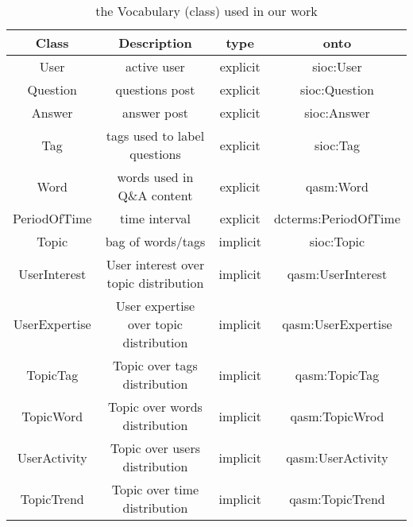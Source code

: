 \begin{sidewaystable}
    \centering
    \begin{tabular}{c|c|c|c}
    \hline
    Class &  Description & type & onto \\ \hline
    User  & active user & explicit &  sioc:User \\ \hline
    Question & questions post & explicit & sioc:Question \\ \hline
    Answer  & answer post & explicit & sioc:Answer \\ \hline
    Tag & tags used to label questions & explicit & sioc:Tag \\ \hline
    Word & words used in Q\&A content & explicit & qasm:Word \\ \hline
    PeriodOfTime & time interval & explicit & dcterms:PeriodOfTime \\ \hline
    Topic & bag of words/tags & implicit & sioc:Topic \\ \hline   
    UserInterest& User interest over topic distribution & implicit& qasm:UserInterest\\ \hline
    UserExpertise & User expertise over topic distribution &implicit& qasm:UserExpertise \\ \hline
    TopicTag &Topic over tags distribution&implicit &qasm:TopicTag \\ \hline
    
    TopicWord&Topic over words distribution &implicit & qasm:TopicWrod\\ \hline
    
    UserActivity&Topic over users distribution & implicit &qasm:UserActivity \\ \hline
    
    TopicTrend &Topic over time distribution &implicit & qasm:TopicTrend\\ \hline
          
    \end{tabular}
    \caption{the Vocabulary (class) used in our work}
    \label{tab:qaontoclass}
\end{sidewaystable}


